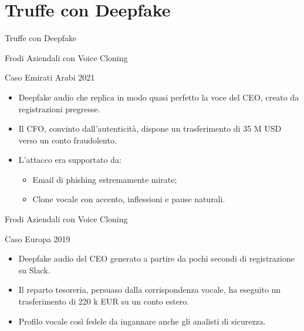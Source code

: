 \documentclass[12pt]{beamer}
\begin{document}
\section{Truffe con Deepfake}
\begin{frame}
\Huge
\begin{center}
Truffe con Deepfake
\end{center}
\end{frame}


\begin{frame}{Frodi Aziendali con Voice Cloning}
  \small
  \begin{alertblock}{Caso Emirati Arabi 2021}
    \begin{itemize}
      \item Deepfake audio che replica in modo quasi perfetto la voce del CEO, creato da registrazioni pregresse.
      \item Il CFO, convinto dall’autenticità, dispone un trasferimento di 35 M USD verso un conto fraudolento.\cite{brewster2021uae}\cite{darkreading_uae_deepfake}
      \item L’attacco era supportato da:
        \begin{itemize}
          \item Email di phishing estremamente mirate;  
          \item Clone vocale con accento, inflessioni e pause naturali.
        \end{itemize}
    \end{itemize}
  \end{alertblock}
\end{frame}

\begin{frame}{Frodi Aziendali con Voice Cloning}
  \small
  \begin{alertblock}{Caso Europa 2019}
    \begin{itemize}
      \item Deepfake audio del CEO generato a partire da pochi secondi di registrazione su Slack.
      \item Il reparto tesoreria, persuaso dalla corrispondenza vocale, ha eseguito un trasferimento di 220 k EUR su un conto estero.\cite{damiani2019voice}
      \item Profilo vocale così fedele da ingannare anche gli analisti di sicurezza.
    \end{itemize}
  \end{alertblock}
\end{frame}
\end{document}
